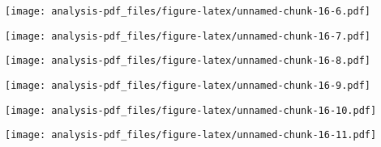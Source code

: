 \documentclass[
]{article}
\newenvironment{Shaded}{\begin{snugshade}}{\end{snugshade}}
\newcommand{\KeywordTok}[1]{\textcolor[rgb]{0.13,0.29,0.53}{\textbf{#1}}}
\newcommand{\NormalTok}[1]{#1}
\newcommand{\OperatorTok}[1]{\textcolor[rgb]{0.81,0.36,0.00}{\textbf{#1}}}
\begin{document}
\texttt{[image: analysis-pdf\_files/figure-latex/unnamed-chunk-16-6.pdf]}

\begin{Shaded}
\end{Shaded}

\texttt{[image: analysis-pdf\_files/figure-latex/unnamed-chunk-16-7.pdf]}

\begin{Shaded}
\end{Shaded}

\texttt{[image: analysis-pdf\_files/figure-latex/unnamed-chunk-16-8.pdf]}

\begin{Shaded}
\end{Shaded}

\texttt{[image: analysis-pdf\_files/figure-latex/unnamed-chunk-16-9.pdf]}

\begin{Shaded}
\end{Shaded}

\texttt{[image: analysis-pdf\_files/figure-latex/unnamed-chunk-16-10.pdf]}

\begin{Shaded}
\end{Shaded}

\texttt{[image: analysis-pdf\_files/figure-latex/unnamed-chunk-16-11.pdf]}

\begin{Shaded}
\end{Shaded}
\end{document}
